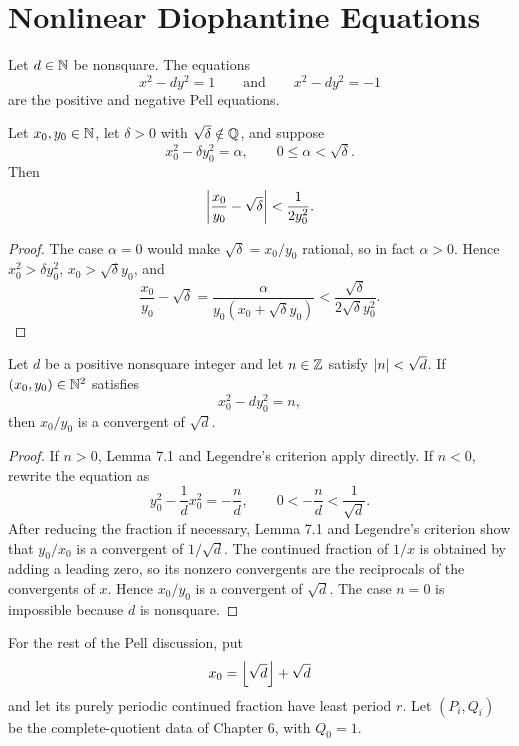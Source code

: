 \chapter{Nonlinear Diophantine Equations}

\begin{de}
Let $d\in\N$ be nonsquare.  The equations
\[
 x^2-dy^2=1
 \qquad\text{and}\qquad
 x^2-dy^2=-1
\]
are the positive and negative Pell equations.
\end{de}

\begin{lem}
Let $x_0,y_0\in\N$, let $\delta>0$ with $\sqrt\delta\notin\Q$, and suppose
\[
 x_0^2-\delta y_0^2=\alpha,
 \qquad
 0\le\alpha<\sqrt\delta.
\]
Then
\[
 \abs*{\frac{x_0}{y_0}-\sqrt\delta}<\frac1{2y_0^2}.
\]
\end{lem}
\begin{proof}
The case $\alpha=0$ would make $\sqrt\delta=x_0/y_0$ rational, so in fact $\alpha>0$.  Hence $x_0^2>\delta y_0^2$, $x_0>\sqrt\delta y_0$, and
\[
 \frac{x_0}{y_0}-\sqrt\delta
 =\frac{\alpha}{y_0(x_0+\sqrt\delta y_0)}
 <\frac{\sqrt\delta}{2\sqrt\delta y_0^2}.
\]
\end{proof}

\begin{thm}
Let $d$ be a positive nonsquare integer and let $n\in\Z$ satisfy $\abs n<\sqrt d$.  If $(x_0,y_0)\in\N^2$ satisfies
\[
 x_0^2-dy_0^2=n,
\]
then $x_0/y_0$ is a convergent of $\sqrt d$.
\end{thm}
\begin{proof}
If $n>0$, Lemma 7.1 and Legendre's criterion apply directly.  If $n<0$, rewrite the equation as
\[
 y_0^2-\frac1d x_0^2=-\frac nd,
 \qquad
 0<-\frac nd<\frac1{\sqrt d}.
\]
After reducing the fraction if necessary, Lemma 7.1 and Legendre's criterion show that $y_0/x_0$ is a convergent of $1/\sqrt d$.  The continued fraction of $1/x$ is obtained by adding a leading zero, so its nonzero convergents are the reciprocals of the convergents of $x$.  Hence $x_0/y_0$ is a convergent of $\sqrt d$.  The case $n=0$ is impossible because $d$ is nonsquare.
\end{proof}

For the rest of the Pell discussion, put
\[
 x_0=\floor{\sqrt d}+\sqrt d
\]
and let its purely periodic continued fraction have least period $r$.  Let
$(P_i,Q_i)$ be the complete-quotient data of Chapter 6, with $Q_0=1$.


